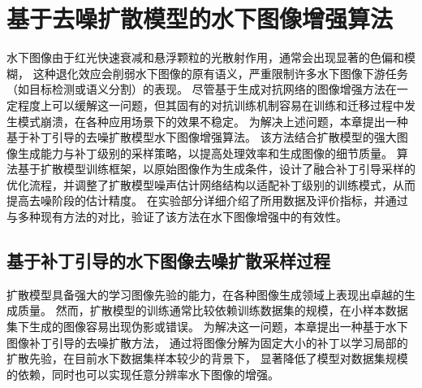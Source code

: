 
\chapter{基于去噪扩散模型的水下图像增强算法}
水下图像由于红光快速衰减和悬浮颗粒的光散射作用，通常会出现显著的色偏和模糊，
这种退化效应会削弱水下图像的原有语义，严重限制许多水下图像下游任务（如目标检测或语义分割）的表现。
尽管基于生成对抗网络的图像增强方法在一定程度上可以缓解这一问题，但其固有的对抗训练机制容易在训练和迁移过程中发生模式崩溃，在各种应用场景下的效果不稳定。
为解决上述问题，本章提出一种基于补丁引导的去噪扩散模型水下图像增强算法。
该方法结合扩散模型的强大图像生成能力与补丁级别的采样策略，以提高处理效率和生成图像的细节质量。
算法基于扩散模型训练框架，以原始图像作为生成条件，设计了融合补丁引导采样的优化流程，并调整了扩散模型噪声估计网络结构以适配补丁级别的训练模式，从而提高去噪阶段的估计精度。
在实验部分详细介绍了所用数据及评价指标，并通过与多种现有方法的对比，验证了该方法在水下图像增强中的有效性。


\section{基于补丁引导的水下图像去噪扩散采样过程}
扩散模型具备强大的学习图像先验的能力，在各种图像生成领域上表现出卓越的生成质量。
然而，扩散模型的训练通常比较依赖训练数据集的规模，在小样本数据集下生成的图像容易出现伪影或错误。
为解决这一问题，本章提出一种基于水下图像补丁引导的去噪扩散方法，
通过将图像分解为固定大小的补丁以学习局部的扩散先验，在目前水下数据集样本较少的背景下，
显著降低了模型对数据集规模的依赖，同时也可以实现任意分辨率水下图像的增强。

